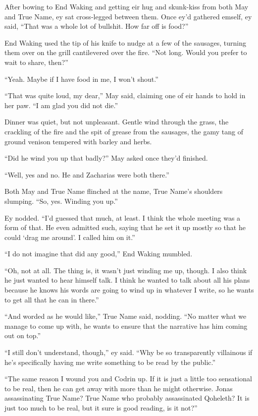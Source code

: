 After bowing to End Waking and getting eir hug and skunk-kiss from both May and True Name, ey sat cross-legged between them. Once ey'd gathered emself, ey said, ``That was a whole lot of bullshit. How far off is food?''

End Waking used the tip of his knife to nudge at a few of the sausages, turning them over on the grill cantilevered over the fire. ``Not long. Would you prefer to wait to share, then?''

``Yeah. Maybe if I have food in me, I won't shout.''

``That was quite loud, my dear,'' May said, claiming one of eir hands to hold in her paw. ``I am glad you did not die.''

Dinner was quiet, but not unpleasant. Gentle wind through the grass, the crackling of the fire and the spit of grease from the sausages, the gamy tang of ground venison tempered with barley and herbs.

``Did he wind you up that badly?'' May asked once they'd finished.

``Well, yes and no. He and Zacharias were both there.''

Both May and True Name flinched at the name, True Name's shoulders slumping. ``So, yes. Winding you up.''

Ey nodded. ``I'd guessed that much, at least. I think the whole meeting was a form of that. He even admitted such, saying that he set it up mostly so that he could `drag me around'. I called him on it.''

``I do not imagine that did any good,'' End Waking mumbled.

``Oh, not at all. The thing is, it wasn't just winding me up, though. I also think he just wanted to hear himself talk. I think he wanted to talk about all his plans because he knows his words are going to wind up in whatever I write, so he wants to get all that he can in there.''

``And worded as he would like,'' True Name said, nodding. ``No matter what we manage to come up with, he wants to ensure that the narrative has him coming out on top.''

``I still don't understand, though,'' ey said. ``Why be so transparently villainous if he's specifically having me write something to be read by the public.''

``The same reason I wound you and Codrin up. If it is just a little too sensational to be real, then he can get away with more than he might otherwise. Jonas assassinating True Name? True Name who probably assassinated Qoheleth? It is just too much to be real, but it sure is good reading, is it not?''

